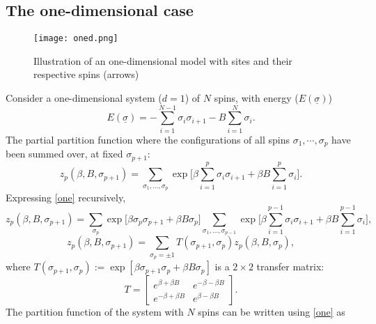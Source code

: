 \documentclass[letterpaper,english,12pt]{article}
\begin{document}
\subsection{The one-dimensional case}
\begin{figure}[hb]
\centering
\texttt{[image: oned.png]}
\caption{Illustration of an one-dimensional model with sites and their respective spins (arrows)}
\end{figure}
Consider a one-dimensional system ($d=1$) of $N$ spins, with energy ($E(\underline{\sigma})$)
$$E(\underline{\sigma})=-\sum_{i=1}^{N-1}\sigma_{i}\sigma_{i+1}-B\sum_{i=1}^{N}\sigma_{i}.$$
The partial partition function where the configurations of all spins $\sigma_{1},\cdots,\sigma_{p}$ have been summed over, at fixed $\sigma_{p+1}$:
\begin{equation}
z_{p}(\beta,B,\sigma_{p+1})=\sum_{\sigma_{1},\hdots,\sigma_{p}}\exp\bigg[\beta\sum_{i=1}^{p}\sigma_{i}\sigma_{i+1}+\beta B \sum_{i=1}^{p}\sigma_{i}\bigg].
\label{one}
\end{equation}
Expressing \eqref{one} recursively,
$$z_{p}(\beta,B,\sigma_{p+1})=\sum_{\sigma_{p}}\exp\bigg[\beta \sigma_{p}\sigma_{p+1}+\beta B \sigma_{p}\bigg]\sum_{\sigma_{1},\hdots,\sigma_{p-1}}\exp\bigg[\beta\sum_{i=1}^{p-1}\sigma_{i}\sigma_{i+1}+\beta B \sum_{i=1}^{p-1}\sigma_{i}\bigg],$$
$$z_{p}(\beta,B,\sigma_{p+1})= \sum_{\sigma_{p}=\pm 1} T(\sigma_{p+1},\sigma_{p})z_{p}(\beta,B,\sigma_{p}),$$ 
where $T(\sigma_{p+1},\sigma_{p}):= \exp[\beta \sigma_{p+1} \sigma_{p}+\beta B \sigma_{p}]$ is a $2 \times 2$ transfer matrix:
$$T = 
\begin{bmatrix}
	e^{\beta+\beta B} & e^{-\beta-\beta B} \\
	e^{-\beta+\beta B} & e^{\beta-\beta B} 
	\end{bmatrix}.$$
The partition function of the system with $N$ spins can be written using \eqref{one} as
\end{document}
